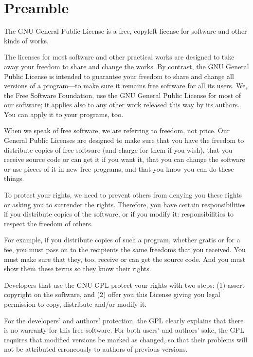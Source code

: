 \documentclass[11pt]{article}
\newcounter{v2section}
\newcounter{v3section}
\begin{document}
\vspace{.3in}



\section*{Preamble}

  The GNU General Public License is a free, copyleft license for software
and other kinds of works.

  The licenses for most software and other practical works are designed
to take away your freedom to share and change the works.  By contrast,
the GNU General Public License is intended to guarantee your freedom to
share and change all versions of a program---to make sure it remains free
software for all its users.  We, the Free Software Foundation, use the
GNU General Public License for most of our software; it applies also to
any other work released this way by its authors.  You can apply it to
your programs, too.

  When we speak of free software, we are referring to freedom, not
price.  Our General Public Licenses are designed to make sure that you
have the freedom to distribute copies of free software (and charge for
them if you wish), that you receive source code or can get it if you
want it, that you can change the software or use pieces of it in new
free programs, and that you know you can do these things.

  To protect your rights, we need to prevent others from denying you
these rights or asking you to surrender the rights.  Therefore, you have
certain responsibilities if you distribute copies of the software, or if
you modify it: responsibilities to respect the freedom of others.

  For example, if you distribute copies of such a program, whether
gratis or for a fee, you must pass on to the recipients the same
freedoms that you received.  You must make sure that they, too,
receive or can get the source code.  And you must show them these
terms so they know their rights.

  Developers that use the GNU GPL protect your rights with two steps:
(1) assert copyright on the software, and (2) offer you this License
giving you legal permission to copy, distribute and/or modify it.

  For the developers' and authors' protection, the GPL clearly explains
that there is no warranty for this free software.  For both users' and
authors' sake, the GPL requires that modified versions be marked as
changed, so that their problems will not be attributed erroneously to
authors of previous versions.
\end{document}
